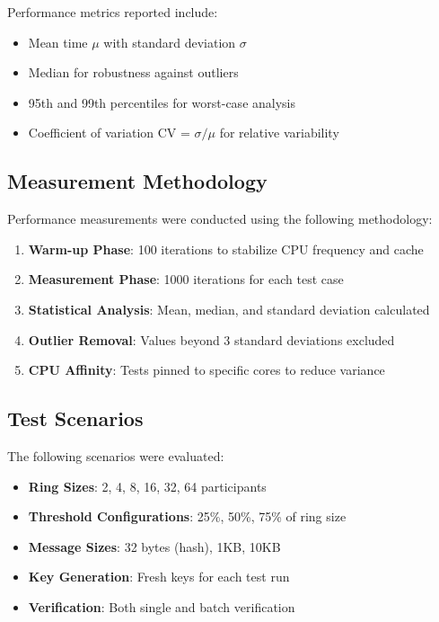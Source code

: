 \documentclass[11pt,a4paper]{article}
\begin{document}
Performance metrics reported include:
\begin{itemize}
\item Mean time $\mu$ with standard deviation $\sigma$
\item Median for robustness against outliers
\item 95th and 99th percentiles for worst-case analysis
\item Coefficient of variation CV = $\sigma/\mu$ for relative variability
\end{itemize}

\subsection{Measurement Methodology}

Performance measurements were conducted using the following methodology:

\begin{enumerate}
\item \textbf{Warm-up Phase}: 100 iterations to stabilize CPU frequency and cache
\item \textbf{Measurement Phase}: 1000 iterations for each test case
\item \textbf{Statistical Analysis}: Mean, median, and standard deviation calculated
\item \textbf{Outlier Removal}: Values beyond 3 standard deviations excluded
\item \textbf{CPU Affinity}: Tests pinned to specific cores to reduce variance
\end{enumerate}

\subsection{Test Scenarios}

The following scenarios were evaluated:

\begin{itemize}
\item \textbf{Ring Sizes}: 2, 4, 8, 16, 32, 64 participants
\item \textbf{Threshold Configurations}: 25\%, 50\%, 75\% of ring size
\item \textbf{Message Sizes}: 32 bytes (hash), 1KB, 10KB
\item \textbf{Key Generation}: Fresh keys for each test run
\item \textbf{Verification}: Both single and batch verification
\end{itemize}
\end{document}
